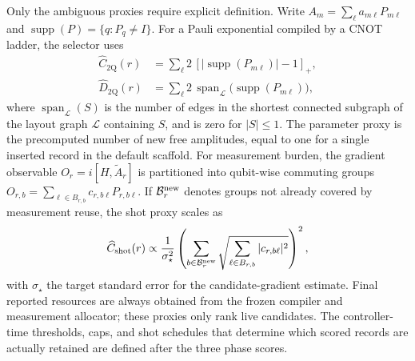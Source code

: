 \documentclass[
  reprint,
  amsmath,
  amssymb,
  aps,
  pra,
  nofootinbib,
  superscriptaddress,
  floatfix
]{revtex4-2}
\newcommand{\twq}{\mathrm{2Q}}
\begin{document}
Only the ambiguous proxies require explicit definition. Write
$A_m=\sum_{\ell}a_{m\ell}P_{m\ell}$ and
$\operatorname{supp}(P)=\{q:P_q\ne I\}$. For a Pauli exponential compiled by a CNOT ladder, the selector uses
\begin{equation}
\begin{aligned}
\widehat C_{\twq}(r)
&=\sum_{\ell}2\,[|\operatorname{supp}(P_{m\ell})|-1]_+,\\
\widehat D_{\twq}(r)
&=\sum_{\ell}2\,\operatorname{span}_{\mathcal L}
\bigl(\operatorname{supp}(P_{m\ell})\bigr),
\end{aligned}
\label{eq:pauli_cost_proxy}
\end{equation}
where $\operatorname{span}_{\mathcal L}(S)$ is the number of edges in the shortest connected subgraph of the layout graph $\mathcal L$ containing $S$, and is zero for $|S|\le1$. The parameter proxy is the precomputed number of new free amplitudes, equal to one for a single inserted record in the default scaffold. For measurement burden, the gradient observable
$O_r=i[H,\widetilde A_r]$ is partitioned into qubit-wise commuting groups $O_{r,b}=\sum_{\ell\in B_{r,b}}c_{r,b\ell}P_{r,b\ell}$. If $\mathcal B_r^{\rm new}$ denotes groups not already covered by measurement reuse, the shot proxy scales as
\begin{equation}
\widehat C_{\rm shot}(r)\propto
\frac{1}{\sigma_\star^2}
\left(
\sum_{b\in\mathcal B_r^{\rm new}}
\sqrt{\sum_{\ell\in B_{r,b}}|c_{r,b\ell}|^2}
\right)^2,
\label{eq:shot_cost_proxy}
\end{equation}
with $\sigma_\star$ the target standard error for the candidate-gradient estimate. Final reported resources are always obtained from the frozen compiler and measurement allocator; these proxies only rank live candidates.
The controller-time thresholds, caps, and shot schedules that determine which scored records are actually retained are defined after the three phase scores.
\end{document}
